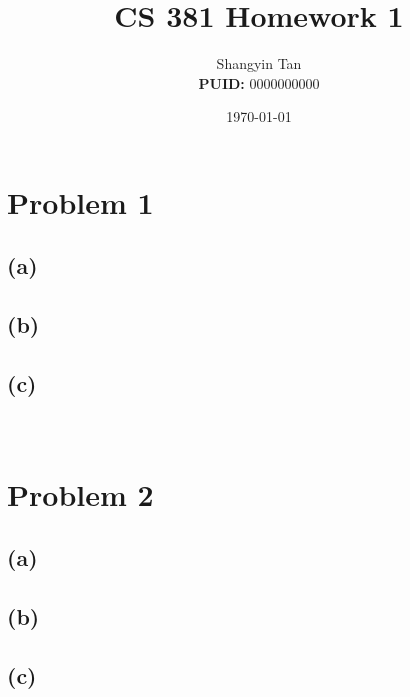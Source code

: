 \documentclass[hidelinks]{article}
\newcommand{\HWNUM}{1} %
\newcommand{\CLASS}{\bf CS 381} %
\newcommand{\NAME}{Shangyin Tan %
\\\textbf{PUID:} 0000000000} %
\newcommand{\DOCTYPE}{Homework} %
\begin{document}
\title{\CLASS{} \DOCTYPE{} \HWNUM{}\vspace*{-0.1in}}
\author{\NAME\vspace*{-0.04in}}
\date{\today}
\maketitle
\thispagestyle{fancy}


\section*{Problem 1}
\subsection*{(a)}
\subsection*{(b)}
\subsection*{(c)}
\textbf{}\\
\section*{Problem 2}
\subsection*{(a)}
\subsection*{(b)}
\subsection*{(c)}
\end{document}
